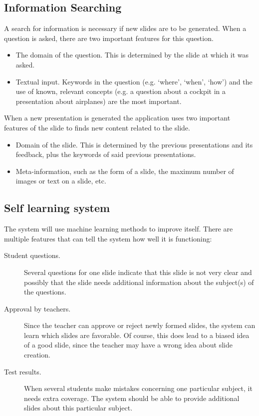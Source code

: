 \documentclass[11pt]{article}
\begin{document}
\subsection{Information Searching}
A search for information is necessary if new slides are to be generated. When a question is asked, there are two important features for this question.
\begin{itemize}
\item The domain of the question. This is determined by the slide at which it was asked. 
\item Textual input. Keywords in the question (e.g. `where', `when', `how') and the use of known, relevant concepts (e.g. a question about a cockpit in a presentation about airplanes) are the most important.
\end{itemize}
When a new presentation is generated the application uses two important features of the slide to finds new content related to the slide.
\begin{itemize}
\item Domain of the slide. This is determined by the previous presentations and its feedback, plus the keywords of said previous presentations.
\item Meta-information, such as the form of a slide, the maximum number of images or text on a slide, etc.
\end{itemize}

\subsection{Self learning system}
The system will use machine learning methods to improve itself. There are multiple features that can tell the system how well it is functioning:
\begin{description}
\item[Student questions.] Several questions for one slide indicate that this slide is not very clear and possibly that the slide needs additional information about the subject(s) of the questions. 
\item[Approval by teachers.] Since the teacher can approve or reject newly formed slides, the system can learn which slides are favorable. Of course, this does lead to a biased idea of a good slide, since the teacher may have a wrong idea about slide creation. 
\item[Test results.] When several students make mistakes concerning one particular subject, it needs extra coverage. The system should be able to provide additional slides about this particular subject.
\end{description}
\end{document}
